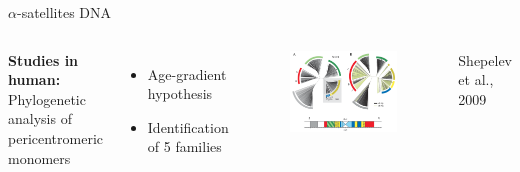 \documentclass[11pt]{beamer}
\begin{document}
\begin{frame}{$\alpha$-satellites DNA}
	\begin{columns}	
		\textbf{Studies in human:}\\
		\medbreak
		Phylogenetic analysis of pericentromeric monomers\\
		\begin{itemize}
			\item Age-gradient hypothesis
			\item Identification of 5 families
		\end{itemize}		
		\begin{figure}
			\includegraphics[width=\textwidth]{img/img_shepelev.png}
		\end{figure}
		\begin{flushright}
			{\tiny Shepelev et al., 2009} 
		\end{flushright}		
	\end{columns}
\end{frame}
\end{document}
